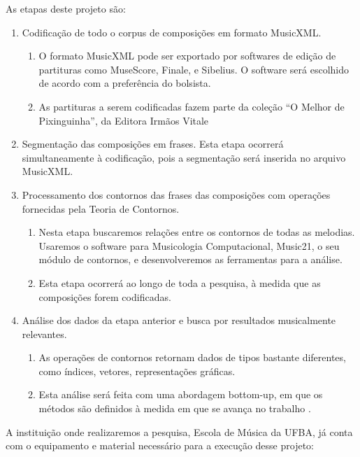 \documentclass[11pt]{article}
\begin{document}
As etapas deste projeto são:
\begin{enumerate}
\item Codificação de todo o corpus de composições em formato MusicXML.
  \begin{enumerate}
  \item O formato MusicXML pode ser exportado por softwares de edição
    de partituras como MuseScore, Finale, e Sibelius. O software será
    escolhido de acordo com a preferência do bolsista.
  \item As partituras a serem codificadas fazem parte da coleção ``O
    Melhor de Pixinguinha'', da Editora Irmãos Vitale
  \end{enumerate}
\item Segmentação das composições em frases. Esta etapa ocorrerá
  simultaneamente à codificação, pois a segmentação será inserida no
  arquivo MusicXML.
\item Processamento dos contornos das frases das composições com
  operações fornecidas pela Teoria de Contornos.
  \begin{enumerate}
  \item Nesta etapa buscaremos relações entre os contornos de todas as
    melodias. Usaremos o software para Musicologia Computacional,
    Music21, o seu módulo de contornos, e desenvolveremos as
    ferramentas para a análise.
  \item Esta etapa ocorrerá ao longo de toda a pesquisa, à medida que
    as composições forem codificadas.
  \end{enumerate}
\item Análise dos dados da etapa anterior e busca por resultados
  musicalmente relevantes.
  \begin{enumerate}
  \item As operações de contornos retornam dados de tipos bastante
    diferentes, como índices, vetores, representações gráficas.
  \item Esta análise será feita com uma abordagem bottom-up, em que os
    métodos são definidos à medida em que se avança no trabalho
    \cite{Graham1994}.
  \end{enumerate}
\end{enumerate}



A instituição onde realizaremos a pesquisa, Escola de Música da UFBA,
já conta com o equipamento e material necessário para a execução desse
projeto:
\end{document}
